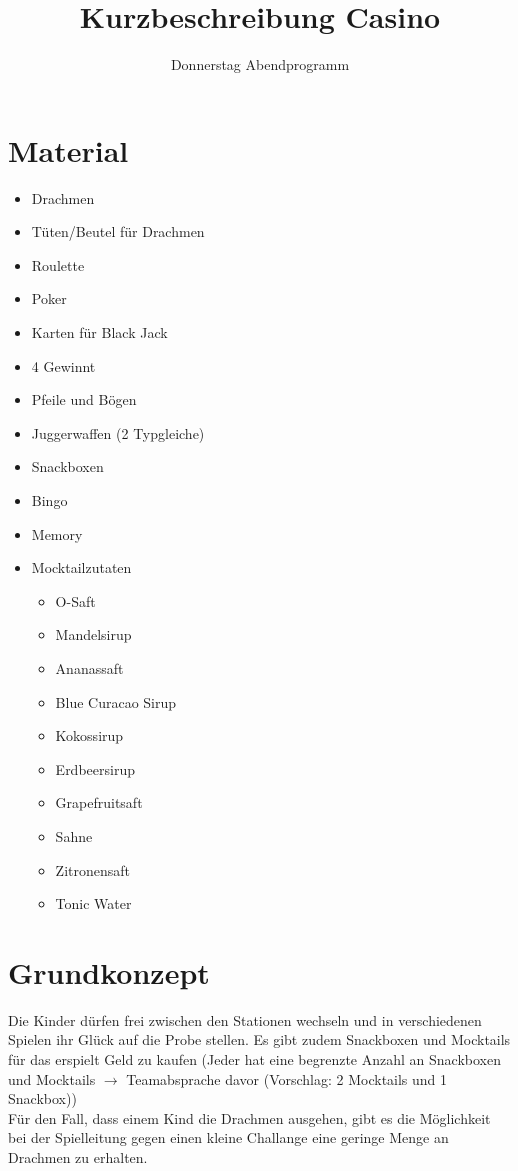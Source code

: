 \documentclass[11pt]{scrartcl}
\title{Kurzbeschreibung Casino}
\subtitle{Donnerstag Abendprogramm}
\author{}
\date{}
\begin{document}
\maketitle \thispagestyle{empty}
\section{Material}
\begin{itemize}
    \item Drachmen
    \item Tüten/Beutel für Drachmen
    \item Roulette
    \item Poker
    \item Karten für Black Jack
    \item 4 Gewinnt
    \item Pfeile und Bögen
    \item Juggerwaffen (2 Typgleiche)
    \item Snackboxen
    \item Bingo
    \item Memory
    \item Mocktailzutaten \begin{itemize}
        \item O-Saft
        \item Mandelsirup
        \item Ananassaft
        \item Blue Curacao Sirup
        \item Kokossirup
        \item Erdbeersirup
        \item Grapefruitsaft
        \item Sahne
        \item Zitronensaft
        \item Tonic Water
    \end{itemize}
\end{itemize}
\newpage
\section{Grundkonzept}
Die Kinder dürfen frei zwischen den Stationen wechseln und in verschiedenen Spielen ihr Glück auf die Probe stellen. Es gibt zudem Snackboxen und Mocktails für das erspielt Geld zu kaufen (Jeder hat eine begrenzte Anzahl an Snackboxen und Mocktails $\to$ Teamabsprache davor (Vorschlag: 2 Mocktails und 1 Snackbox))\\ Für den Fall, dass einem Kind die Drachmen ausgehen, gibt es die Möglichkeit bei der Spielleitung gegen einen kleine Challange eine geringe Menge an Drachmen zu erhalten.
\end{document}

